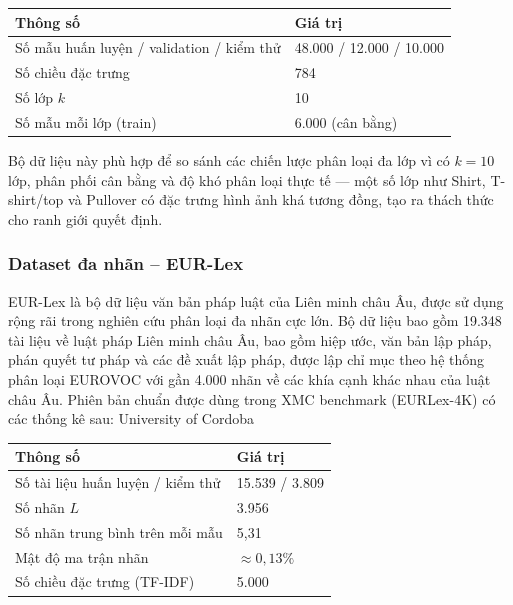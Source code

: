 \begin{table}[h]
\centering
\begin{tabular}{|l|l|}
\hline
\textbf{Thông số} & \textbf{Giá trị} \\
\hline
Số mẫu huấn luyện / validation / kiểm thử & 48.000 / 12.000 / 10.000 \\
\hline
Số chiều đặc trưng & 784 \\
\hline
Số lớp $k$ & 10 \\
\hline
Số mẫu mỗi lớp (train) & 6.000 (cân bằng) \\
\hline
\end{tabular}
\end{table}

Bộ dữ liệu này phù hợp để so sánh các chiến lược phân loại đa lớp vì có $k = 10$ lớp, phân phối cân bằng và độ khó phân loại thực tế — một số lớp như Shirt, T-shirt/top và Pullover có đặc trưng hình ảnh khá tương đồng, tạo ra thách thức cho ranh giới quyết định.

\subsubsection{Dataset đa nhãn -- EUR-Lex}

EUR-Lex là bộ dữ liệu văn bản pháp luật của Liên minh châu Âu, được sử dụng rộng rãi trong nghiên cứu phân loại đa nhãn cực lớn. Bộ dữ liệu bao gồm 19.348 tài liệu về luật pháp Liên minh châu Âu, bao gồm hiệp ước, văn bản lập pháp, phán quyết tư pháp và các đề xuất lập pháp, được lập chỉ mục theo hệ thống phân loại EUROVOC với gần 4.000 nhãn về các khía cạnh khác nhau của luật châu Âu. Phiên bản chuẩn được dùng trong XMC benchmark (EURLex-4K) có các thống kê sau: University of Cordoba

\begin{table}[h]
\centering
\begin{tabular}{|l|l|}
\hline
\textbf{Thông số} & \textbf{Giá trị} \\
\hline
Số tài liệu huấn luyện / kiểm thử & 15.539 / 3.809 \\
\hline
Số nhãn $L$ & 3.956 \\
\hline
Số nhãn trung bình trên mỗi mẫu & 5,31 \\
\hline
Mật độ ma trận nhãn & $\approx 0{,}13\%$ \\
\hline
Số chiều đặc trưng (TF-IDF) & 5.000 \\
\hline
\end{tabular}
\end{table}

